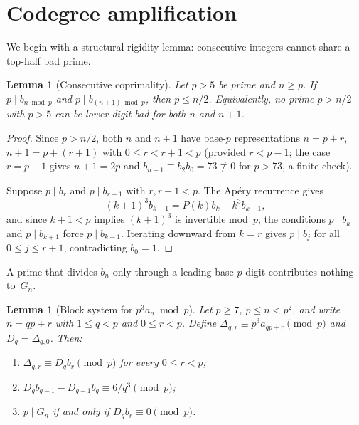 \documentclass[11pt]{article}
\newtheorem{lemma}[theorem]{Lemma}
\theoremstyle{definition}
\theoremstyle{remark}
\begin{document}
\section{Codegree amplification}\label{sec:codegree}

We begin with a structural rigidity lemma:
consecutive integers cannot share a top-half bad prime.

\begin{lemma}[Consecutive coprimality]\label{lem:consec}
Let $p > 5$ be prime and $n \ge p$.
If $p \mid b_{n \bmod p}$ and
$p \mid b_{(n+1) \bmod p}$,
then $p \le n/2$.
Equivalently, no prime $p > n/2$ with $p > 5$
can be lower-digit bad for both $n$ and $n+1$.
\end{lemma}

\begin{proof}
Since $p > n/2$, both $n$ and $n+1$ have
base-$p$ representations $n = p + r$,
$n+1 = p + (r+1)$ with $0 \le r < r + 1 < p$
(provided $r < p - 1$; the case $r = p - 1$
gives $n + 1 = 2p$ and $b_{n+1} \equiv b_2 b_0
= 73 \not\equiv 0$ for $p > 73$, a finite check).

Suppose $p \mid b_r$ and $p \mid b_{r+1}$
with $r, r+1 < p$.
The Ap\'ery recurrence gives
\[
(k+1)^3 b_{k+1} = P(k) b_k - k^3 b_{k-1},
\]
and since $k+1 < p$ implies $(k+1)^3$
is invertible mod~$p$,
the conditions $p \mid b_k$ and $p \mid b_{k+1}$
force $p \mid b_{k-1}$. Iterating downward
from $k = r$ gives $p \mid b_j$ for all
$0 \le j \le r + 1$, contradicting
$b_0 = 1$.
\end{proof}

A prime that divides $b_n$ only through a leading
base-$p$ digit contributes nothing to~$G_n$.

\begin{lemma}[Block system for $p^3 a_n \bmod p$]
\label{lem:block}
Let $p \ge 7$, $p \le n < p^2$, and write $n = qp + r$
with $1 \le q < p$ and $0 \le r < p$.
Define $\Delta_{q,r} \equiv p^3 a_{qp+r} \pmod{p}$
and $D_q = \Delta_{q,0}$. Then:
\begin{enumerate}
\item[(i)]
$\Delta_{q,r} \equiv D_q b_r \pmod{p}$
for every $0 \le r < p$;
\item[(ii)]
$D_q b_{q-1} - D_{q-1} b_q \equiv 6/q^3 \pmod{p}$;
\item[(iii)]
$p \mid G_n$ if and only if $D_q b_r \equiv 0 \pmod{p}$.
\end{enumerate}
\end{lemma}
\end{document}
